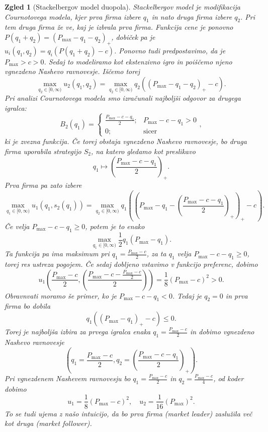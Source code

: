 \documentclass[10pt, a4paper]{article}
\newtheorem{zgled}[izr]{Zgled}
\begin{document}
\begin{zgled}[Stackelbergov model duopola]
  Stackelbergov model je modifikacija Cournotovega modela,
  kjer prva firma izbere $q_1$ in nato druga firma izbere $q_2$.
  Pri tem druga firma že ve, kaj je izbrala prva firma.
  Funkcija cene je ponovno $P(q_1 + q_2) = (P_{\max} -q_1 -q_2)_+$,
  dobiček pa je $u_i (q_1, q_2) = q_i(P(q_1 + q_2) - c)$.
  Ponovno tudi predpostavimo, da je $P_{\max} > c >0$.
  Sedaj to modeliramo kot ekstenzivno igro in poiščemo njeno vgnezdeno Nashevo ravnovesje.
  Iščemo torej 
  $$\max_{q_2 \in [0, \infty)} u_2 (q_1, q_2) = \max_{q_2 \in [0, \infty)} q_2 ((P_{\max} - q_1 - q_2)_+ - c).$$
  Pri analizi Cournotovega modela smo izračunali najboljši odgovor za drugega igralca:
  $$B_2 (q_1) = \begin{cases}
    \frac{P_{\max} - c - q_1}{2};& P_{\max} - c- q_1 > 0\\
    0;& \textrm{sicer}
  \end{cases},$$
  ki je zvezna funkcija. Če torej obstaja vgnezdeno Nashevo ravnovesje, bo druga firma uporabila strategijo $S_2$, 
  na katero gledamo kot preslikavo 
  $$q_1 \mapsto \left(\frac{P_{\max} - c - q_1}{2}\right)_+.$$
  Prva firma pa zato izbere 
  $$\max_{q_1 \in [0, \infty)} u_1 (q_1, s_2 (q_1)) = \max_{q_2 \in [0, \infty)} q_1 \left(\left(P_{\max} - q_1 - \left(\frac{P_{\max} - c- q_1}{2}\right)_+\right)_+ - c\right).$$
  Če velja $P_{\max} - c - q_1 \geq 0$, potem je to enako 
  $$\max_{q_1 \in [0, \infty)} \frac{1}{2} q_1 (P_{\max} - q_1).$$
  Ta funkcija pa ima maksimum pri $q_1 = \frac{P_{\max} - c}{2}$, za ta $q_1$ velja $P_{\max} - c - q_1 \geq 0$, torej 
  res ustreza pogojem. Če sedaj dobljeno vstavimo v funkcijo preferenc, dobimo 
  $$u_1\left(\frac{P_{\max} - c}{2}, \left(\frac{P_{\max} - c - \frac{P_{\max} - c}{2}}{2}\right)\right) = \frac{1}{8} (P_{\max} - c)^2 > 0.$$ 
  Obravnvati moramo še primer, ko je $P_{\max} - c - q_1 < 0$.
  Tedaj je $q_2 = 0$ in prva firma bo dobila 
  $$q_1 ((P_{\max} - q_1)_+ - c) \leq 0.$$
  Torej je najboljša izbira za prvega igralca enaka $q_1 = \frac{P_{\max} - c}{2}$
  in dobimo vgnezdeno Nashevo ravnovesje 
  $$\left(q_1 = \frac{P_{\max} - c}{2}, q_2 = \left(\frac{P_{\max} - c - q_1}{2}\right)_+\right).$$
  Pri vgnezdenem Nashevem ravnovesju bo $q_1 = \frac{P_{\max} - c}{2}$ in $q_2 = \frac{P_{\max} - c}{4}$, od koder dobimo 
  $$u_1 = \frac{1}{8} (P_{\max} - c)^2,\quad u_2 = \frac{1}{16} (P_{\max})^2.$$
  To se tudi ujema z našo intuicijo, da bo prva firma (market leader)
  zaslužila več kot druga (market follower).
\end{zgled}
\end{document}

